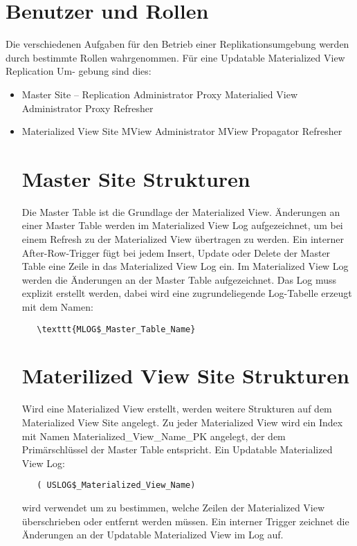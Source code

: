 \documentclass[a4paper,10pt,titlepage=false]{scrreprt}
\begin{document}
\section{Benutzer und Rollen} %
\label{sec:benutzer_und_rollen}
Die verschiedenen Aufgaben für den Betrieb einer Replikationsumgebung werden durch
bestimmte Rollen wahrgenommen. Für eine Updatable Materialized View Replication Um-
gebung sind dies:
\begin{itemize}
  \item Master Site
  \subitem – Replication Administrator
 \subitem Proxy Materialied View Administrator
\subitem  Proxy Refresher
\item Materialized View Site
\subitem MView Administrator
\subitem MView Propagator
\subitem Refresher
\section{Master Site Strukturen} %
\label{sec:master_site_strukturen}
Die Master Table ist die Grundlage der Materialized View. Änderungen an einer Master Table
werden im Materialized View Log aufgezeichnet, um bei einem Refresh zu der Materialized
View übertragen zu werden.
Ein interner After-Row-Trigger fügt bei jedem Insert, Update oder Delete der Master Table
eine Zeile in das Materialized View Log ein.
Im Materialized View Log werden die Änderungen an der Master Table aufgezeichnet. Das
Log muss explizit erstellt werden, dabei wird eine zugrundeliegende Log-Tabelle erzeugt
mit dem Namen:
\begin{verbatim}
   \texttt{MLOG$_Master_Table_Name}
\end{verbatim}
\section{Materilized View Site Strukturen} %
\label{sec:materilized_view_site_strukturen}
Wird eine Materialized View erstellt, werden weitere Strukturen auf dem Materialized View
Site angelegt.
Zu jeder Materialized View wird ein Index mit Namen Materialized\_View\_Name\_PK angelegt,
der dem Primärschlüssel der Master Table entspricht.
Ein Updatable Materialized View Log:\\
\begin{verbatim}
   ( USLOG$_Materialized_View_Name)
 \end{verbatim}  wird verwendet um
zu bestimmen, welche Zeilen der Materialized View überschrieben oder entfernt werden
müssen.
Ein interner Trigger zeichnet die Änderungen an der Updatable Materialized View im Log
auf.

\end{itemize}
\end{document}
